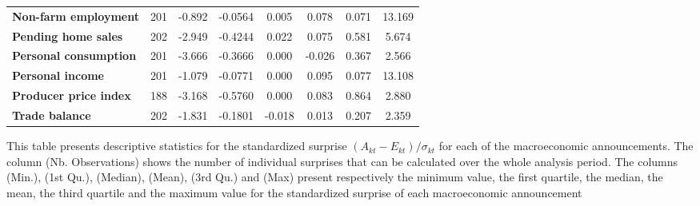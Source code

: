 \begin{landscape}
\begin{table}[]
\begin{center}
\begin{tabular}{@{}lccccccc@{}}
\textbf{Non-farm employment}      & 201                               & -0.892                            & -0.0564                              & 0.005                    & 0.078                    & 0.071                       & 13.169                   \\
\textbf{Pending home sales}       & 202                               & -2.949                            & -0.4244                              & 0.022                    & 0.075                    & 0.581                       & 5.674                    \\
\textbf{Personal consumption}     & 201                               & -3.666                            & -0.3666                              & 0.000                    & -0.026                   & 0.367                       & 2.566                    \\
\textbf{Personal income}          & 201                               & -1.079                            & -0.0771                              & 0.000                    & 0.095                    & 0.077                       & 13.108                   \\
\textbf{Producer price index}     & 188                               & -3.168                            & -0.5760                              & 0.000                    & 0.083                    & 0.864                       & 2.880                    \\
\textbf{Trade balance}            & 202                               & -1.831                            & -0.1801                              & -0.018                   & 0.013                    & 0.207                       & 2.359                    \\ \bottomrule
\end{tabular}
\end{center}
\begin{tablenotes}\item 
        \singlespacing
        \footnotesize
This table presents descriptive statistics for the standardized surprise $(A_{kt}-E_{kt})/\sigma_{kt}$ for each of the macroeconomic announcements. The column (Nb. Observations) shows the number of individual surprises that can be calculated over the whole analysis period. The columns (Min.), (1st Qu.), (Median), (Mean), (3rd Qu.) and (Max) present respectively the minimum value, the first quartile, the median, the mean, the third quartile and the maximum value for the standardized surprise of each macroeconomic announcement 
\end{tablenotes}
\end{table}
\end{landscape}

